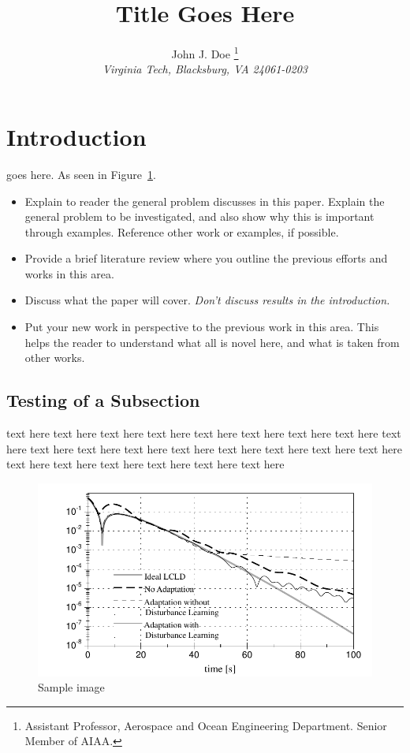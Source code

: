 \documentclass[paper]{aiaaNew}
\title{Title Goes Here}
\author{
%
John J. Doe%
%
  \thanks{Assistant Professor,  
  Aerospace and Ocean Engineering Department.  Senior Member of AIAA.}
  \\
  \emph{\normalsize Virginia Tech, Blacksburg, VA 24061-0203}
}
\begin{document}
\maketitle




\section{Introduction}
goes here.   As seen in Figure~\ref{fig:sample}.  

\begin{itemize}
	\item Explain to reader the general problem discusses in this paper.  Explain the general problem to be investigated, and also show why this is important through examples.  Reference other work or examples, if possible.    
	\item Provide a brief literature review where you outline the previous efforts and works in this area. 
	\item Discuss what the paper will cover.  \emph{Don't discuss results in the introduction.}  
	\item Put your new work in perspective to the previous work in this area.  This helps the reader to understand what all is novel here, and what is taken from other works.  
\end{itemize}


 \subsection{Testing of a Subsection}
 
 text here text here text here text here text here text here text here text here text here text here text here text here text here text here text here text here text here text here text here text here text here text here text here 
 
 \begin{figure}[htb]
 	\centering
 	\includegraphics[]{Figures/sample}
 	\caption{Sample image}
 	\label{fig:sample}
 \end{figure}
 
\end{document}
